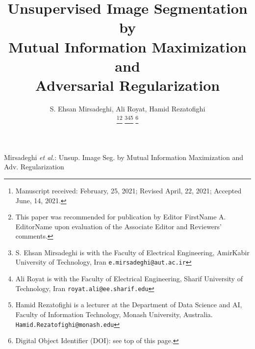 \documentclass[letterpaper, 10 pt, journal, twoside]{IEEEtran}
\begin{document}
\title{Unsupervised Image Segmentation by \\ Mutual Information Maximization and \\ Adversarial Regularization}


\author{S. Ehsan Mirsadeghi, Ali Royat,  Hamid Rezatofighi

\thanks{Manuscript received: February, 25, 2021; Revised April, 22, 2021; Accepted June, 14, 2021.}\thanks{This paper was recommended for publication by Editor FirstName A. EditorName upon evaluation of the Associate Editor and Reviewers' comments.} \thanks{S. Ehsan Mirsadeghi is with the Faculty of Electrical Engineering, AmirKabir University of Technology, Iran
        {\tt\small e.mirsadeghi@aut.ac.ir}}\thanks{Ali Royat is with the Faculty of Electrical Engineering, Sharif University of Technology, Iran
        {\tt\small royat.ali@ee.sharif.edu}}\thanks{Hamid Rezatofighi is a lecturer at the Department of Data Science and AI, Faculty of Information Technology, Monash University, Australia.
        {\tt\small Hamid.Rezatofighi@monash.edu}}
\thanks{Digital Object Identifier (DOI): see top of this page.}
}




{Mirsadeghi \MakeLowercase{\textit{et al.}}: Unsup. Image Seg. by Mutual Information Maximization and Adv. Regularization} 















\maketitle
\end{document}
